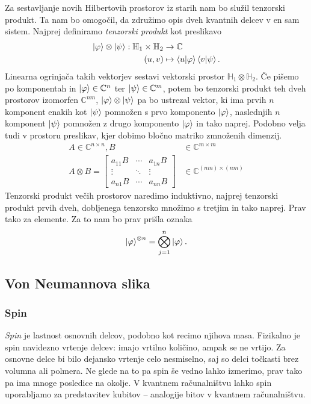 \documentclass[mat1]{fmfdelo}
\newcommand{\C}{\mathbb C}
\newcommand{\Hb}{\mathbb H}
\begin{document}
Za sestavljanje novih Hilbertovih prostorov iz starih nam bo služil tenzorski produkt. Ta nam bo omogočil, da združimo opis dveh kvantnih delcev v en sam sistem. Najprej definiramo \emph{tenzorski produkt} kot preslikavo
\begin{align*}
    \ket\varphi \otimes \ket\psi : \Hb_1 \times \Hb_2 &\to \mathbb C\\
    (u,v) &\mapsto \braket{u}{\varphi} \braket{v}{\psi}.
\end{align*}
Linearna ogrinjača takih vektorjev sestavi vektorski prostor \(\Hb_1 \otimes \Hb_2\). Če pišemo po komponentah in \(\ket\varphi\in\C^n\) ter \(\ket\psi\in\C^m\), potem bo tenzorski produkt teh dveh prostorov izomorfen \(\C^{nm}\), \(\ket\varphi\otimes\ket\psi\) pa bo ustrezal vektor, ki ima prvih \(n\) komponent enakih kot \(\ket\psi\) pomnožen s prvo komponento \(\ket\varphi\), naslednjih \(n\) komponent \(\ket\psi\) pomnožen z drugo komponento \(\ket\varphi\) in tako naprej. Podobno velja tudi v prostoru preslikav, kjer dobimo bločno matriko zmnoženih dimenzij.
\begin{align*}
    A\in \C^{n\times n}, B&\in\C^{m\times m}\\
    A\otimes B = \begin{bmatrix}
        a_{11}B&\cdots&a_{1n}B\\
        \vdots&\ddots&\vdots\\
        a_{n1}B&\cdots&a_{nn}B
    \end{bmatrix}&\in \C^{(nm)\times (nm)}
\end{align*}
Tenzorski produkt večih prostorov naredimo induktivno, najprej tenzorski produkt prvih dveh, dobljenega tenzorsko množimo s tretjim in tako naprej. Prav tako za elemente. Za to nam bo prav prišla oznaka
\begin{align*}
    \ket{\varphi}^{\otimes n} = \bigotimes_{j=1}^n \ket\varphi.
\end{align*}

\subsection{Von Neumannova slika}
\subsubsection{Spin}
\emph{Spin} je lastnost osnovnih delcov, podobno kot recimo njihova masa. Fizikalno je spin navidezno vrtenje delcev: imajo vrtilno količino, ampak se ne vrtijo. Za osnovne delce bi bilo dejansko vrtenje celo nesmiselno, saj so delci točkasti brez volumna ali polmera. Ne glede na to pa spin še vedno lahko izmerimo, prav tako pa ima mnoge posledice na okolje. V kvantnem računalništvu lahko spin uporabljamo za predstavitev kubitov -- analogije bitov v kvantnem računalništvu. 
\end{document}
